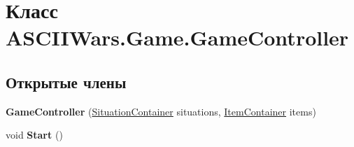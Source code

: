 \hypertarget{class_a_s_c_i_i_wars_1_1_game_1_1_game_controller}{}\section{Класс A\+S\+C\+I\+I\+Wars.\+Game.\+Game\+Controller}
\label{class_a_s_c_i_i_wars_1_1_game_1_1_game_controller}
\subsection*{Открытые члены}
\begin{DoxyCompactItemize}
\item 
\hypertarget{class_a_s_c_i_i_wars_1_1_game_1_1_game_controller_a9a4ad508f104af513b81824b784b0bb0}{}\label{class_a_s_c_i_i_wars_1_1_game_1_1_game_controller_a9a4ad508f104af513b81824b784b0bb0} 
{\bfseries Game\+Controller} (\hyperlink{class_a_s_c_i_i_wars_1_1_game_1_1_situation_container}{Situation\+Container} situations, \hyperlink{class_a_s_c_i_i_wars_1_1_game_1_1_item_container}{Item\+Container} items)
\item 
\hypertarget{class_a_s_c_i_i_wars_1_1_game_1_1_game_controller_a6a70e650d0140338ebd053c56cd55496}{}\label{class_a_s_c_i_i_wars_1_1_game_1_1_game_controller_a6a70e650d0140338ebd053c56cd55496} 
void {\bfseries Start} ()
\end{DoxyCompactItemize}
